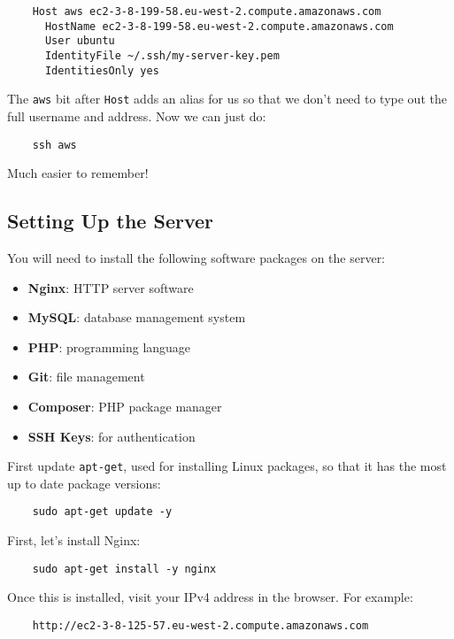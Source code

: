 \begin{verbatim}
    Host aws ec2-3-8-199-58.eu-west-2.compute.amazonaws.com
      HostName ec2-3-8-199-58.eu-west-2.compute.amazonaws.com
      User ubuntu
      IdentityFile ~/.ssh/my-server-key.pem
      IdentitiesOnly yes
\end{verbatim}

The \texttt{aws} bit after \texttt{Host} adds an alias for us so that we don't need to type out the full username and address. Now we can just do:

\begin{verbatim}
    ssh aws
\end{verbatim}

Much easier to remember!



\subsection{Setting Up the Server}

You will need to install the following software packages on the server:

\begin{itemize}
    \item \textbf{Nginx}: HTTP server software
    \item \textbf{MySQL}: database management system
    \item \textbf{PHP}: programming language
    \item \textbf{Git}: file management
    \item \textbf{Composer}: PHP package manager
    \item \textbf{SSH Keys}: for authentication
\end{itemize}

First update \texttt{apt-get}, used for installing Linux packages, so that it has the most up to date package versions:

\begin{verbatim}
    sudo apt-get update -y
\end{verbatim}

First, let's install Nginx:

\begin{verbatim}
    sudo apt-get install -y nginx
\end{verbatim}

Once this is installed, visit your IPv4 address in the browser. For example:

\begin{verbatim}
    http://ec2-3-8-125-57.eu-west-2.compute.amazonaws.com
\end{verbatim}

